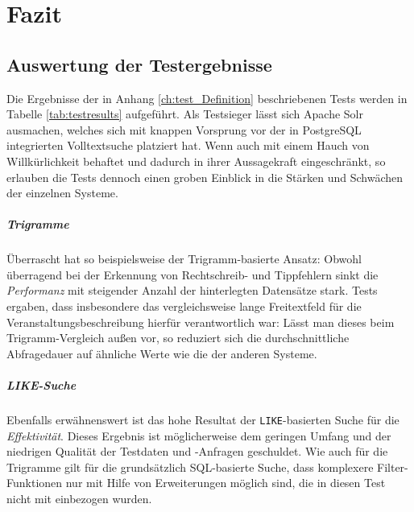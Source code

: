 \chapter{Fazit}


\section{Auswertung der Testergebnisse}

Die Ergebnisse der in Anhang \ref{ch:test_Definition} beschriebenen Tests werden in Tabelle \ref{tab:testresults} aufgeführt. Als Testsieger lässt sich Apache Solr ausmachen, welches sich mit knappen Vorsprung vor der in PostgreSQL integrierten Volltextsuche platziert hat. Wenn auch mit einem Hauch von Willkürlichkeit behaftet und dadurch in ihrer Aussagekraft eingeschränkt, so erlauben die Tests dennoch einen groben Einblick in die Stärken und Schwächen der einzelnen Systeme.

\paragraph{Trigramme} Überrascht hat so beispielsweise der Trigramm-basierte Ansatz: Obwohl überragend bei der Erkennung von Rechtschreib- und Tippfehlern sinkt die \emph{Performanz} mit steigender Anzahl der hinterlegten Datensätze stark. Tests ergaben, dass insbesondere das vergleichsweise lange Freitextfeld für die Veranstaltungsbeschreibung hierfür verantwortlich war: Lässt man dieses beim Trigramm-Vergleich außen vor, so reduziert sich die durchschnittliche Abfragedauer auf ähnliche Werte wie die der anderen Systeme.

\paragraph{LIKE-Suche} Ebenfalls erwähnenswert ist das hohe Resultat der \texttt{LIKE}-basierten Suche für die \emph{Effektivität}. Dieses Ergebnis ist möglicherweise dem geringen Umfang und der niedrigen Qualität der Testdaten und -Anfragen geschuldet. Wie auch für die Trigramme gilt für die grundsätzlich SQL-basierte Suche, dass komplexere Filter-Funktionen nur mit Hilfe von Erweiterungen möglich sind, die in diesen Test nicht mit einbezogen wurden.

